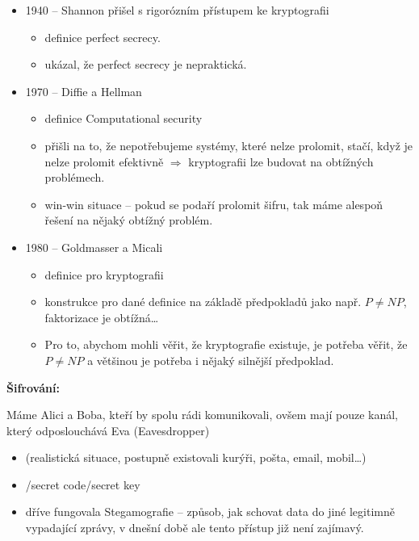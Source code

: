 \documentclass[a4paper,12pt,titlepage]{article}
\def\podnadpis#1{{\bigskip\bf\noindent#1\medskip\par}}
\begin{document}
\begin{itemize}
\item 1940 -- Shannon přišel s rigorózním přístupem ke kryptografii
\begin{itemize}
\item definice perfect secrecy.

\item ukázal, že perfect secrecy je nepraktická.
\end{itemize}

\item 1970 -- Diffie a Hellman
\begin{itemize}
\item definice Computational security

\item přišli na to, že nepotřebujeme systémy, které nelze prolomit, stačí, když
je nelze prolomit efektivně $\Rightarrow$ kryptografii lze budovat na obtížných
problémech.

\item win-win situace -- pokud se podaří prolomit šifru, tak máme alespoň
řešení na nějaký obtížný problém.

\end{itemize}

\item1980 -- Goldmasser a Micali
\begin{itemize}

\item{} definice pro kryptografii

\item konstrukce pro dané definice na základě předpokladů jako např. $P \neq
NP$, faktorizace je obtížná\dots

\item Pro to, abychom mohli věřit, že kryptografie existuje, je potřeba věřit,
že $P \neq NP$ a většinou je potřeba i nějaký silnější předpoklad.

\end{itemize}
\end{itemize}

\podnadpis {Šifrování:}

\noindent Máme Alici a Boba, kteří by spolu rádi komunikovali, ovšem mají pouze
kanál, který odposlouchává Eva (Eavesdropper)

\begin{itemize}

\item(realistická situace, postupně existovali kurýři, pošta, email, mobil\dots) 

\item{}/secret code/secret key

\item dříve fungovala Stegamografie -- způsob, jak schovat data do jiné
legitimně vypadající zprávy, v dnešní době ale tento přístup již není zajímavý.

\end{itemize}
\end{document}
